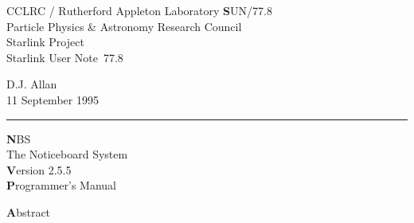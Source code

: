 \documentclass[twoside,11pt]{article}
\newcommand{\stardoccategory}  {Starlink User Note}
\newcommand{\stardocinitials}  {SUN}
\newcommand{\stardocnumber}    {77.8}
\newcommand{\stardocauthors}   {D.J. Allan}
\newcommand{\stardocdate}      {11 September 1995}
\newcommand{\stardoctitle}     {NBS \\ [1ex] The Noticeboard System}
\newcommand{\stardocversion}   {Version 2.5.5}
\newcommand{\stardocmanual}    {Programmer's Manual}
\newcommand{\stardocname}{\stardocinitials /\stardocnumber}
\newenvironment{latexonly}{}{}
\renewcommand{\_}{\texttt{\symbol{95}}}
\begin{document}
\thispagestyle{empty}

\begin{latexonly}
   CCLRC / {\textsc Rutherford Appleton Laboratory} \hfill {\textbf \stardocname}\\
   {\large Particle Physics \& Astronomy Research Council}\\
   {\large Starlink Project\\}
   {\large \stardoccategory\ \stardocnumber}
   \begin{flushright}
   \stardocauthors\\
   \stardocdate
   \end{flushright}
   \vspace{-4mm}
   \rule{\textwidth}{0.5mm}
   \vspace{5mm}
   \begin{center}
   {\Huge\textbf  \stardoctitle \\ [2.5ex]}
   {\LARGE\textbf \stardocversion \\ [4ex]}
   {\Huge\textbf  \stardocmanual}
   \end{center}
   \vspace{5mm}


   \vspace{10mm}
   \begin{center}
      {\Large\textbf Abstract}
   \end{center}
\end{latexonly}
\end{document}
